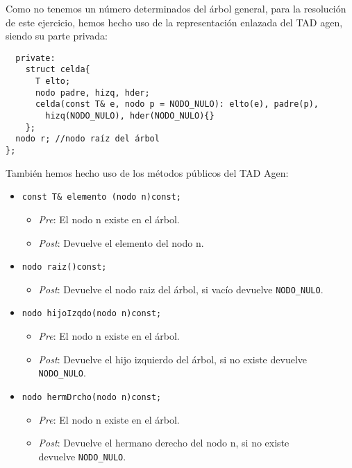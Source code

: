 Como no tenemos un número determinados del árbol general, para la resolución de este ejercicio, hemos hecho uso de la representación enlazada del TAD agen, siendo su parte privada:
\begin{verbatim}
  private:
    struct celda{
      T elto;
      nodo padre, hizq, hder;
      celda(const T& e, nodo p = NODO_NULO): elto(e), padre(p),
        hizq(NODO_NULO), hder(NODO_NULO){}
    };
  nodo r; //nodo raíz del árbol
};
\end{verbatim}

También hemos hecho uso de los métodos públicos del TAD Agen:
\begin{itemize}
  \item \verb |const T& elemento (nodo n)const;|
  \begin{itemize}
    \item \textit{Pre}: El nodo n existe en el árbol.
    \item \textit{Post}: Devuelve el elemento del nodo n.
  \end{itemize}
  \item \verb |nodo raiz()const;|
  \begin{itemize}
    \item \textit{Post}: Devuelve el nodo raiz del árbol, si vacío devuelve \texttt{NODO\_NULO}.
  \end{itemize}
  \item \verb |nodo hijoIzqdo(nodo n)const;|
  \begin{itemize}
    \item \textit{Pre}: El nodo n existe en el árbol.
    \item \textit{Post}: Devuelve el hijo izquierdo del árbol, si no existe devuelve \texttt{NODO\_NULO}.
  \end{itemize}
  \item \verb |nodo hermDrcho(nodo n)const;|
  \begin{itemize}
    \item \textit{Pre}: El nodo n existe en el árbol.
    \item \textit{Post}: Devuelve el hermano derecho del nodo n, si no existe\\ devuelve \texttt{NODO\_NULO}.
  \end{itemize}
\end{itemize}